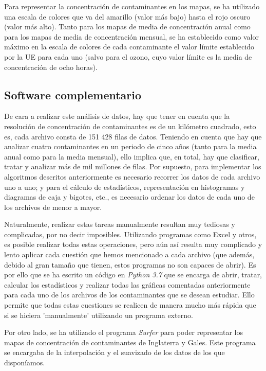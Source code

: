 \documentclass[12pt]{article}
\begin{document}
Para representar la concentración de contaminantes en los mapas, se ha utilizado una escala de colores que va del amarillo (valor más bajo) hasta el rojo oscuro (valor más alto). Tanto para los mapas de media de concentración anual como para los mapas de media de concentración mensual, se ha establecido como valor máximo en la escala de colores de cada contaminante el valor límite establecido por la UE para cada uno (salvo para el ozono, cuyo valor límite es la media de concentración de ocho horas).

\subsection{Software complementario}

De cara a realizar este análisis de datos, hay que tener en cuenta que la resolución de concentración de contaminantes es de un kilómetro cuadrado, esto es, cada archivo consta de 151 428 filas de datos. Teniendo en cuenta que hay que analizar cuatro contaminantes en un periodo de cinco años (tanto para la media anual como para la media mensual), ello implica que, en total, hay que clasificar, tratar y analizar más de mil millones de filas. Por supuesto, para implementar los algoritmos descritos anteriormente es necesario recorrer los datos de cada archivo uno a uno; y para el cálculo de estadísticos, representación en histogramas y diagramas de caja y bigotes, etc., es necesario ordenar los datos de cada uno de los archivos de menor a mayor. 

Naturalmente, realizar estas tareas manualmente resultan muy tediosas y complicadas, por no decir imposibles. Utilizando programas como Excel y otros, es posible realizar todas estas operaciones, pero aún así resulta muy complicado y lento aplicar cada cuestión que hemos mencionado a cada archivo (que además, debido al gran tamaño que tienen, estos programas no son capaces de abrir). Es por ello que se ha escrito un código en \textit{Python 3.7} que se encarga de abrir, tratar, calcular los estadísticos y realizar todas las gráficas comentadas anteriormente para cada uno de los archivos de los contaminantes que se desean estudiar. Ello permite que todas estas cuestiones se realicen de manera mucho más rápida que si se hiciera 'manualmente' utilizando un programa externo.

Por otro lado, se ha utilizado el programa \textit{Surfer} para poder representar los mapas de concentración de contaminantes de Inglaterra y Gales. Este programa se encargaba de la interpolación y el suavizado de los datos de los que disponíamos.
\end{document}
